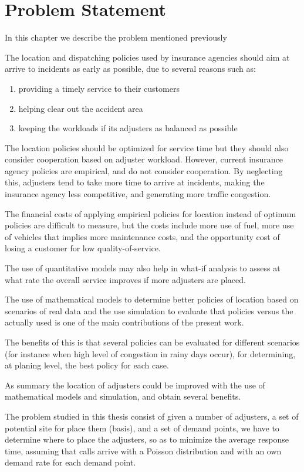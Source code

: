 \section{Problem Statement}
In this chapter we describe the problem
mentioned previously

The location and dispatching policies
used by insurance agencies
should aim
at arrive to incidents
as early as possible,
due to several reasons
such as:
\begin{enumerate}
\item providing a timely service to their customers
\item helping clear out the accident area
\item keeping the workloads if its adjusters
  as balanced as possible
\end{enumerate}
The location policies
should be optimized for service time
but they should also consider
cooperation based on adjuster workload.
However,
current insurance agency policies
are empirical,
and do not consider cooperation.
By neglecting this,
adjusters tend to take
more time to arrive at incidents,
making the insurance agency
less competitive,
and generating more traffic congestion.

The financial costs
of applying
empirical policies for location
instead of optimum policies
are difficult to measure,
but the costs include
more use of fuel,
more use of vehicles
that implies
more maintenance costs,
and the opportunity cost
of losing a customer
for low quality-of-service.

The use of quantitative models
may also help
in what-if analysis
to assess at what rate
the overall service
improves if more adjusters are placed.

The use of mathematical models
to determine better policies of location
based on scenarios
of real data
and the use simulation
to evaluate that policies
versus the actually used
is one of the main contributions
of the present work.

The benefits of this
is that several policies
can be evaluated
for different scenarios
(for instance
when high level of congestion
in rainy days occur),
for determining,
at planing level,
the best policy
for each case.

As summary
the location of adjusters
could be improved
with the use of
mathematical models and simulation,
and obtain several benefits.

The problem studied in this thesis
consist of
given a number of adjusters,
a set of potential site for place them (basis),
and a set of demand points,
we have to determine
where to place the adjusters,
so as to minimize 
the average response time,
assuming
that calls
arrive with a Poisson distribution
and with an own demand rate
for each demand point.
